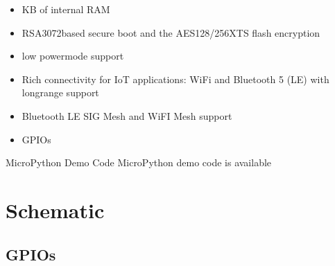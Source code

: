 \documentclass[letterpaper,8pt,english]{sphinxmanual}
\begin{document}
\begin{description}
\begin{itemize}
\item {} 
 KB of internal RAM

\item {} 
\sphinxAtStartPar
RSA\sphinxhyphen{}3072\sphinxhyphen{}based secure boot and the AES\sphinxhyphen{}128/256\sphinxhyphen{}XTS flash encryption

\item {} 
\sphinxAtStartPar
low power\sphinxhyphen{}mode support

\item {} 
\sphinxAtStartPar
Rich connectivity for IoT applications: Wi\sphinxhyphen{}Fi and Bluetooth 5 (LE) with long\sphinxhyphen{}range support

\item {} 
\sphinxAtStartPar
Bluetooth LE SIG Mesh and Wi\sphinxhyphen{}FI Mesh support

\item {} 
 GPIOs

\end{itemize}


\nopagebreak


\sphinxAtStartPar
MicroPython Demo Code
MicroPython demo code is available



\end{description}


\chapter{Schematic}
\label{\detokenize{schematic:schematic}}\label{\detokenize{schematic::doc}}
\noindent{}


\section{GPIOs}
\label{\detokenize{schematic:gpios}}
\end{document}
